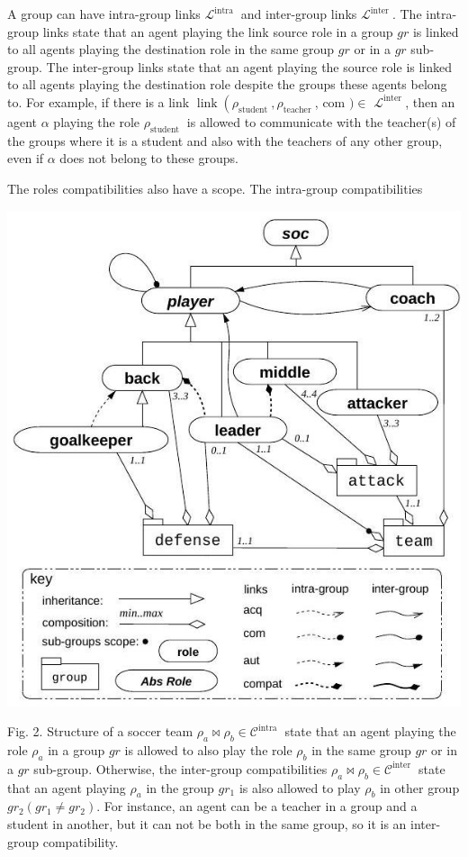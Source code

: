 \documentclass[10pt]{article}
\begin{document}
A group can have intra-group links $\mathcal{L}^{\text {intra }}$ and inter-group links $\mathcal{L}^{\text {inter }}$. The intra-group links state that an agent playing the link source role in a group $g r$ is linked to all agents playing the destination role in the same group $g r$ or in a $g r$ sub-group. The inter-group links state that an agent playing the source role is linked to all agents playing the destination role despite the groups these agents belong to. For example, if there is a link $\operatorname{link}\left(\rho_{\text {student }}, \rho_{\text {teacher }}\right.$, com $) \in$ $\mathcal{L}^{\text {inter }}$, then an agent $\alpha$ playing the role $\rho_{\text {student }}$ is allowed to communicate with the teacher(s) of the groups where it is a student and also with the teachers of any other group, even if $\alpha$ does not belong to these groups.

The roles compatibilities also have a scope. The intra-group compatibilities

\begin{center}
\includegraphics[max width=\textwidth]{2024_01_14_42477cbf96ee593f2d4dg-3}
\end{center}

Fig. 2. Structure of a soccer team $\rho_{a} \bowtie \rho_{b} \in \mathcal{C}^{\text {intra }}$ state that an agent playing the role $\rho_{a}$ in a group $g r$ is allowed to also play the role $\rho_{b}$ in the same group $g r$ or in a $g r$ sub-group. Otherwise, the inter-group compatibilities $\rho_{a} \bowtie \rho_{b} \in \mathcal{C}^{\text {inter }}$ state that an agent playing $\rho_{a}$ in the group $g r_{1}$ is also allowed to play $\rho_{b}$ in other group $g r_{2}\left(g r_{1} \neq g r_{2}\right)$. For instance, an agent can be a teacher in a group and a student in another, but it can not be both in the same group, so it is an inter-group compatibility.
\end{document}
